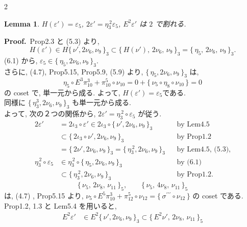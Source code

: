 \documentclass[10pt, leqno]{ltjsarticle}
\newcommand{\todai}[2][]{\{\,#2\,\}_{#1}}      %
\newcommand{\gen}[1]{\{\,#1\,\}}       %
\numberwithin{equation}{section}
\theoremstyle{plain}
\newtheorem{lemma}[theorem]{Lemma}
\theoremstyle{definition}
\theoremstyle{remark}
\begin{document}
\begin{paracol}{2}

\begin{lemma}\label{lem:6.6}
\(H(\varepsilon')=\varepsilon_{5}\), \quad
\(2\varepsilon'=\eta_{3}^{\,2}\varepsilon_{5}\), \quad
\(E^{2}\varepsilon'\) は $2$ で割れる. 
\end{lemma}

\noindent
\textbf{Proof.}\
Prop2.3 と (5.3) より,
\[
H(\varepsilon')\in H\todai[3]{\nu',2\nu_{6},\nu_{9}}
 \subset \todai[3]{H(\nu'),\,2\nu_{6},\,\nu_{9}}
 = \todai[3]{\eta_{5},\,2\nu_{6},\,\nu_{9}} .
\]
(6.1) から, \(\varepsilon_{5}\in \todai[3]{\eta_{5},2\nu_{6},\nu_{9}} .\)\\
さらに, (4.7), Prop5.15, Prop5.9, (5.9) より,
\(\todai[3]{\eta_{5},2\nu_{6},\nu_{9}}\) は,
\[
\eta_{5}\circ E^{3}\pi^{3}_{10}+\pi^{5}_{10}\circ \nu_{10}
= 0+\gen{\nu_{5}\circ \eta_{8}\circ \nu_{10}}=0
\]
の coset で, 単一元から成る. 
よって, \(H(\varepsilon')=\varepsilon_{5}\)である. \\
同様に \(\todai[3]{\eta_{3}^{3},2\nu_{6},\nu_{9}}\) 
も単一元から成る. \\
よって, 次の２つの関係から,
\(2\varepsilon'=\eta_{3}^{\,2}\circ\varepsilon_{5}\) が従う. 
\[
\begin{align*}
2\varepsilon'
& = 2\iota_{3}\circ \varepsilon'
\in 2\iota_{3}\circ \todai[3]{\nu',2\nu_{6},\nu_{9}}
&& \text{by Lem4.5}\\
& \subset \todai[3]{2\iota_{3}\circ\nu',2\nu_{6}, \nu_{9}}
&& \text{by Prop1.2}\\
& = \todai[3]{2\nu',2\nu_{6},\nu_{9}}
= \todai[3]{\eta_{3}^{\,2},2\nu_{6},\nu_{9}}
&& \text{by Lem4.5, (5.3)},\\
\eta_{3}^{\,2}\circ \varepsilon_{5}
& \in \eta_{3}^{\,2}\circ \todai[3]{\eta_{5},2\nu_{6},\nu_{9}}
&& \text{by (6.1)}\\
& \subset \todai[3]{\eta_{3}^{\,2},2\nu_{6},\nu_{9}}
&& \text{by Prop1.2}.
\end{align*}
\]
\[
\todai[5]{\nu_{5},\,2\nu_{8},\,\nu_{11}},\qquad
\todai[5]{\nu_{5},\,4\nu_{8},\,\nu_{11}}
\]
は,  (4.7) , Prop5.15 より, 
\(\nu_{5}\circ E^{5}\pi^{3}_{10}+\pi^{5}_{12}\circ \nu_{12}=\gen{\sigma^{\prime\prime\prime}\circ \nu_{12}}\)
の coset である. \\
Prop1.2, 1.3 と Lem5.4 を用いると,
\[
\begin{align*}
E^{2}\varepsilon'
& \in E^{2}\todai[3]{\nu',2\nu_{6},\nu_{9}}
\subset \todai[5]{E^{2}\nu',\,2\nu_{8},\,\nu_{11}} \\

\end{align*}\]
\end{paracol}
\end{document}

